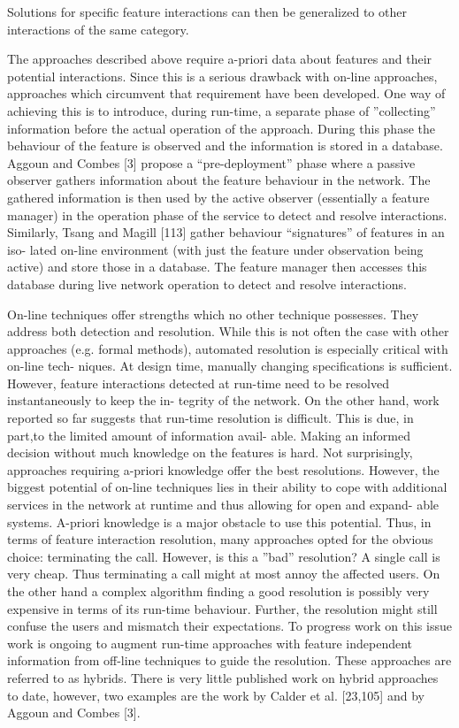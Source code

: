 Solutions for specific feature interactions can then be generalized to other interactions of the same category.

The approaches described above require a-priori data about features and their potential interactions. Since this is a serious drawback with on-line approaches, approaches which circumvent that requirement have been developed. One way of achieving this is to introduce, during run-time, a separate phase of ”collecting” information before the actual operation of the approach. During this phase the behaviour of the feature is observed and the information is stored in a database. Aggoun and Combes [3] propose a “pre-deployment” phase where a passive observer gathers information about the feature behaviour in the network. The gathered information is then used by the active observer (essentially a feature manager) in the operation phase of the service to detect and resolve interactions. Similarly, Tsang and Magill [113] gather behaviour “signatures” of features in an iso- lated on-line environment (with just the feature under observation being active) and store those in a database. The feature manager then accesses this database during live network operation to detect and resolve interactions.

On-line techniques offer strengths which no other technique possesses. They address both detection and resolution. While this is not often the case with other approaches (e.g. formal methods), automated resolution is especially critical with on-line tech- niques. At design time, manually changing specifications is sufficient. However, feature interactions detected at run-time need to be resolved instantaneously to keep the in- tegrity of the network. On the other hand, work reported so far suggests that run-time resolution is difficult. This is due, in part,to the limited amount of information avail- able. Making an informed decision without much knowledge on the features is hard. Not surprisingly, approaches requiring a-priori knowledge offer the best resolutions. However, the biggest potential of on-line techniques lies in their ability to cope with additional services in the network at runtime and thus allowing for open and expand- able systems. A-priori knowledge is a major obstacle to use this potential. Thus, in terms of feature interaction resolution, many approaches opted for the obvious choice: terminating the call. However, is this a ”bad” resolution? A single call is very cheap. Thus terminating a call might at most annoy the affected users. On the other hand a complex algorithm finding a good resolution is possibly very expensive in terms of its run-time behaviour. Further, the resolution might still confuse the users and mismatch their expectations. To progress work on this issue work is ongoing to augment run-time approaches with feature independent information from off-line techniques to guide the resolution. These approaches are referred to as hybrids. There is very little published work on hybrid approaches to date, however, two examples are the work by Calder et al. [23,105] and by Aggoun and Combes [3].